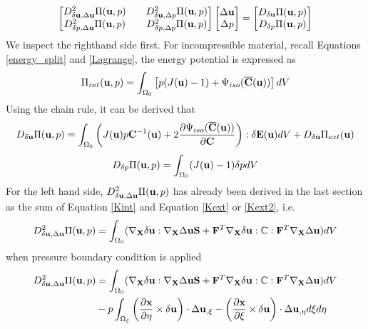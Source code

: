 \begin{equation} \label{linear}
\begin{bmatrix}
D_{\delta\bold{u}, \Delta\bold{u}}^2 \Pi(\bold{u}, p)  && D_{\delta\bold{u}, \Delta{p}}^2 \Pi(\bold{u}, p)  \\ D_{\delta{p}, \Delta\bold{u}}^2 \Pi(\bold{u}, p)  && D_{\delta{p}, \Delta{p}}^2 \Pi(\bold{u}, p) 
\end{bmatrix}
\begin{bmatrix}
\Delta\bold{u} \\ \Delta{p}
\end{bmatrix}
= 
\begin{bmatrix}
D_{\delta\bold{u}}\Pi(\bold{u}, p) \\ D_{\delta{p}}\Pi(\bold{u}, p) 
\end{bmatrix}
\end{equation}
We inspect the righthand side first. For incompressible material, recall Equations \ref{energy_split} and \ref{Lagrange}, the energy potential is expressed as
\begin{equation} \label{split3}
\Pi_{int}(\bold{u}, p) = \int_{\Omega_0} \left[ p(J(\bold{u}) - 1) + \Psi_{iso}(\overline{\bold{C}}(\bold{u}))\right] dV
\end{equation}
Using the chain rule, it can be derived that
\begin{equation}\label{rhs1}
D_{\delta\bold{u}}\Pi(\bold{u}, p) = \int_{\Omega_0}\left( J(\bold{u})p\bold{C}^{-1}(\bold{u}) + 
2\frac{\partial{\Psi_{iso}(\overline{\bold{C}}(\bold{u}))}}{\partial{\bold{C}}}  \right) : \delta\bold{E}(\bold{u}) dV + D_{\delta\bold{u}}\Pi_{ext}(\bold{u})
\end{equation}
\begin{equation}\label{rhs2}
D_{\delta{p}}\Pi(\bold{u}, p) = \int_{\Omega_0} (J(\bold{u}) - 1 )\delta{p} dV
\end{equation}
For the left hand side, $D_{\delta\bold{u}, \Delta\bold{u}}^2 \Pi(\bold{u}, p)$ has already been derived in the last section as the sum of Equation \ref{Kint} and Equation \ref{Kext} or \ref{Kext2}, i.e.
\begin{equation} \label{lhs0}
D_{\delta\bold{u}, \Delta\bold{u}}^2 \Pi(\bold{u}, p) =  \int_{\Omega_0}(\nabla_{\bold{X}}\delta\bold{u} : \nabla_{\bold{X}}\Delta\bold{u}\bold{S} + \bold{F}^T\nabla_{\bold{X}}\delta{\bold{u}} : \mathbb{C} : \bold{F}^T \nabla_{\bold{X}}\Delta\bold{u})dV  \end{equation}
when pressure boundary condition is applied
\begin{equation} \label{lhs1}
\begin{split}
D_{\delta\bold{u}, \Delta\bold{u}}^2 \Pi(\bold{u}, p) 
&= \int_{\Omega_0}(\nabla_{\bold{X}}\delta\bold{u} : \nabla_{\bold{X}}\Delta\bold{u}\bold{S} + \bold{F}^T\nabla_{\bold{X}}\delta{\bold{u}} : \mathbb{C} : \bold{F}^T \nabla_{\bold{X}}\Delta\bold{u})dV  \\
&-  p\int_{\Omega_{\xi}}  \left(\frac{\partial{\bold{x}}}{\partial{\eta}} \times \delta\bold{u}\right) \cdot\Delta{\bold{u}}_{,\xi} - 
\left(\frac{\partial{\bold{x}}}{\partial{\xi}} \times \delta\bold{u}\right) \cdot\Delta{\bold{u}}_{,\eta} d\xi{d\eta}
\end{split}
\end{equation}
